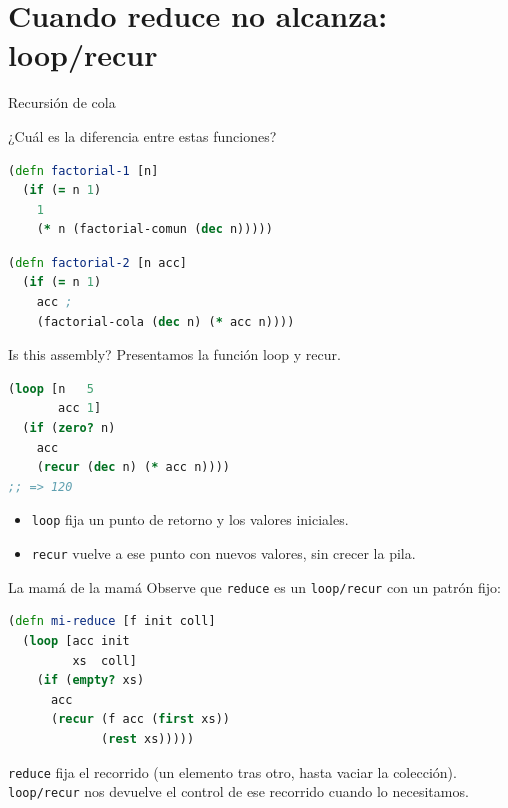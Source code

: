\documentclass{beamer}
\begin{document}
\section{Cuando reduce no alcanza: loop/recur}

\begin{frame}[fragile]{Recursión de cola}

¿Cuál es la diferencia entre estas funciones?

\begin{lstlisting}[language=Clojure]
(defn factorial-1 [n]
  (if (= n 1)
    1
    (* n (factorial-comun (dec n)))))
\end{lstlisting}

\begin{lstlisting}[language=Clojure]
  (defn factorial-2 [n acc]
  (if (= n 1)
    acc ; 
    (factorial-cola (dec n) (* acc n))))
\end{lstlisting}

\end{frame}



\begin{frame}[fragile]{Is this assembly?}
    Presentamos la función loop y recur.

\begin{lstlisting}[language=Clojure]
(loop [n   5
       acc 1]
  (if (zero? n)
    acc
    (recur (dec n) (* acc n))))
;; => 120
\end{lstlisting}

\begin{itemize}
        \item \texttt{loop} fija un punto de retorno y los valores iniciales.
        \item \texttt{recur} vuelve a ese punto con nuevos valores, sin crecer la pila.
\end{itemize}
\end{frame}

\begin{frame}[fragile]{La mamá de la mamá}
    Observe que \texttt{reduce} es un \texttt{loop/recur} con un patrón fijo:

    \begin{lstlisting}[language=Clojure]
(defn mi-reduce [f init coll]
  (loop [acc init
         xs  coll]
    (if (empty? xs)
      acc
      (recur (f acc (first xs))
             (rest xs)))))
    \end{lstlisting}

    \vspace{0.2cm}
    \texttt{reduce} fija el recorrido (un elemento tras otro, hasta vaciar la colección). \texttt{loop/recur} nos devuelve el control de ese recorrido cuando lo necesitamos.
\end{frame}
\end{document}
